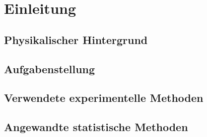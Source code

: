 \documentclass[../main.tex]{subfiles} %
\begin{document}
\chapter{Einleitung}\label{ch:einleitung}


    \section{Physikalischer Hintergrund}\label{sec:physikalischer-hintergrund}


    \section{Aufgabenstellung}\label{sec:aufgabenstellung}


    \section{Verwendete experimentelle Methoden}\label{sec:verwendete-experimentelle-methoden}


    \section{Angewandte statistische Methoden}\label{sec:angewandte-statistische-methoden}
\end{document}
